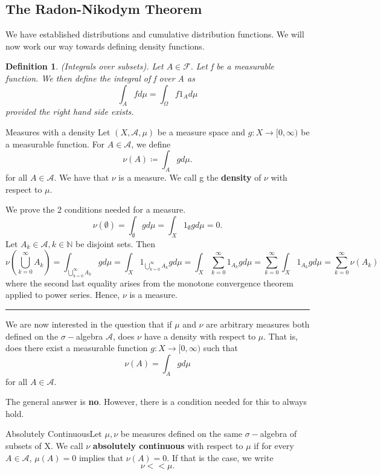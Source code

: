 \documentclass[twoside]{article}
\newtheorem{definition}[theorem]{Definition}
\newenvironment{proof}{{\bf Proof:}}{\hfill\rule{2mm}{2mm}}
\begin{document}
\subsection{The Radon-Nikodym Theorem}
We have established distributions and cumulative distribution functions. We will now work our way towards defining density functions.

\begin{definition}(Integrals over subsets). Let $A \in \mathcal{F}.$ Let f be a measurable function. We then define the integral of f over A as 
$$
\int_Afd\mu = \int_{\Omega}f1_{A}d\mu
$$
provided the right hand side exists.
\end{definition}

\begin{definition_exam}{Measures with a density}{}
Let $(X, \mathcal{A}, \mu)$ be a measure space and $g: X \rightarrow [0, \infty)$ be a measurable function. For $A \in \mathcal{A}$, we define 
$$
\nu(A) \coloneqq \int_{A}gd\mu.
$$
for all $A \in \mathcal{A}$. We have that $\nu$ is a measure. We call g the \textbf{density} of $\nu$ with respect to $\mu.$
\end{definition_exam}

\begin{proof} We prove the 2 conditions needed for a measure.
$$
\nu(\emptyset) = \int_{\emptyset}gd\mu = \int_X1_{\emptyset}gd\mu = 0.
$$
Let $A_k \in \mathcal{A}, k \in \mathbb{N}$ be disjoint sets. 
Then 
$$
\nu(\bigcup_{k=0}^{\infty}A_k) = \int_{\bigcup_{k=0}^{\infty}A_k}gd\mu = \int_X1_{\bigcup_{k=0}^{\infty}A_k}gd\mu = \int_X\sum_{k=0}^{\infty}1_{A_{k}}gd\mu = \sum_{k=0}^{\infty}\int_X1_{A_{k}}gd\mu = \sum_{k=0}^{\infty}\nu(A_k)
$$
where the second last equality arises from the monotone convergence theorem applied to power series. Hence, $\nu$ is a measure.
\end{proof}


We are now interested in the question that if $\mu$ and $\nu$ are arbitrary measures both defined on the $\sigma-$algebra $\mathcal{A}$, does $\nu$ have a density with respect to $\mu$. That is, does there exist a measurable function $g: X \rightarrow [0,\infty)$ such that 
$$
\nu(A) = \int_{A}gd\mu
$$
for all $A \in \mathcal{A}.$

The general answer is \textbf{no}. However, there is a condition needed for this to always hold.


\begin{definition_exam}{Absolutely Continuous}{}Let $\mu, \nu$ be measures defined on the same $\sigma-$algebra of subsets of X. We call $\nu$ \textbf{absolutely continuous} with respect to $\mu$ if for every $A \in \mathcal{A}$, $\mu(A) = 0$ implies that $\nu(A) = 0.$ If that is the case, we write 
$$
\nu << \mu.
$$
\end{definition_exam}
\end{document}
